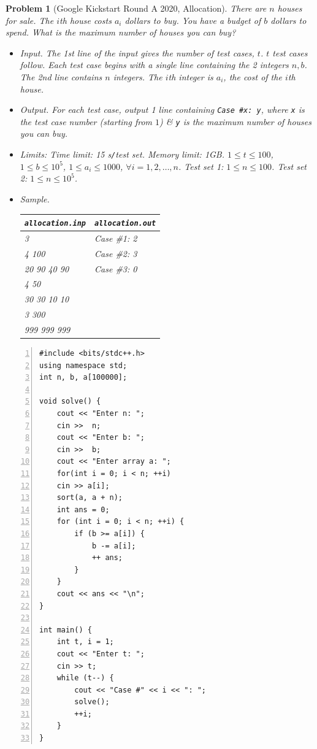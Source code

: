 \documentclass{article}
\newtheorem{problem}{Problem}
\begin{document}
\begin{problem}[Google Kickstart Round A 2020, Allocation]
	There are $n$ houses for sale. The $i$th house costs $a_i$ dollars to buy. You have a budget of $b$ dollars to spend. What is the maximum number of houses you can buy?
	\begin{itemize}
		\item {\sf Input.} The 1st line of the input gives the number of test cases, $t$. $t$ test cases follow. Each test case begins with a single line containing the 2 integers $n,b$. The 2nd line contains $n$ integers. The $i$th integer is $a_i$, the cost of the $i$th house.
		\item {\sf Output.} For each test case, output 1 line containing \verb|Case #x: y|, where \texttt{x} is the test case number (starting from $1$) \& \texttt{y} is the maximum number of houses you can buy.
		\item {\sf Limits:} Time limit: \emph{15 s\texttt{/}test set}. Memory limit: \emph{1GB}. $1\le t\le100$, $1\le b\le10^5$, $1\le a_i\le1000$, $\forall i = 1,2,\ldots,n$. Test set 1: $1\le n\le100$. Test set 2: $1\le n\le10^5$.
		\item {\sf Sample.}
		\begin{table}[H]
			\centering
			\begin{tabular}{|l|l|}
				\hline
				\texttt{allocation.inp} & \texttt{allocation.out} \\
				\hline
				3 & Case \#1: 2 \\
				4 100 & Case \#2: 3 \\
				20 90 40 90 & Case \#3: 0 \\
				4 50 & \\
				30 30 10 10 & \\
				3 300 & \\
				999 999 999 & \\
				\hline
			\end{tabular}
		\end{table}
	\end{itemize}
\end{problem}

\begin{Verbatim}[numbers=left,xleftmargin=5mm]
#include <bits/stdc++.h>
using namespace std;
int n, b, a[100000];

void solve() {
    cout << "Enter n: ";
    cin >>  n;
    cout << "Enter b: ";
    cin >>  b;
    cout << "Enter array a: ";
    for(int i = 0; i < n; ++i)
    cin >> a[i];
    sort(a, a + n);
    int ans = 0;
    for (int i = 0; i < n; ++i) {
        if (b >= a[i]) {
            b -= a[i];
            ++ ans;
        }
    }
    cout << ans << "\n";
}

int main() {
    int t, i = 1;
    cout << "Enter t: ";
    cin >> t;
    while (t--) {
        cout << "Case #" << i << ": ";
        solve();
        ++i;
    }
}
\end{Verbatim}
\end{document}
